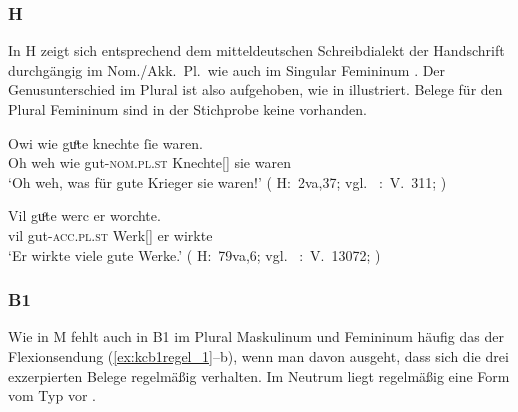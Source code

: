 \subsubsection{H}
In H zeigt sich entsprechend dem mitteldeutschen
Schreibdialekt der Handschrift durch\-gängig  im Nom./Akk.\ Pl.\ wie
auch im Singular Femininum \autocite[vgl.][181--184]{ksw2}. Der
Genus\-unterschied im Plural ist also aufgehoben, wie in 
illustriert. Belege für den Plural Femininum sind in der Stichprobe keine
vorhanden.

\begin{exe}
\ex \label{ex:kchregel}
	\begin{xlist}
	\ex \label{ex:kchregel_1}
		\gll Owi wie guͦte knechte ſie waren. \\
			{Oh weh} wie gut-\textsc{nom.pl.st} Knechte[\MascM] sie waren \\
		\trans `Oh weh, was für gute Krieger sie waren!'
			(%
				H:~2va,37; vgl.~%
				\KC:~V.~311;
				\cite[85]{schroeder1895}%
			)

	\ex \label{ex:kchregel_2}
		\gll Vil guͦte werc er worchte. \\
			vil gut-\textsc{acc.pl.st} Werk[\NeutI] er wirkte \\
		\trans `Er wirkte viele gute Werke.'
			(%
				H:~79va,6; vgl.~%
				\KC:~V.~13072;
				\cite[318]{schroeder1895}%
			)
	\end{xlist}
\end{exe}

\subsubsection{B1}
Wie in M fehlt auch in B1 im Plural Maskulinum und Femininum häufig
das  der Flexionsendung (\ref{ex:kcb1regel_1}--b),
wenn man davon ausgeht, dass sich die drei exzerpierten Belege regelmäßig
verhalten. Im Neutrum liegt regelmäßig eine Form vom Typ  vor
.

